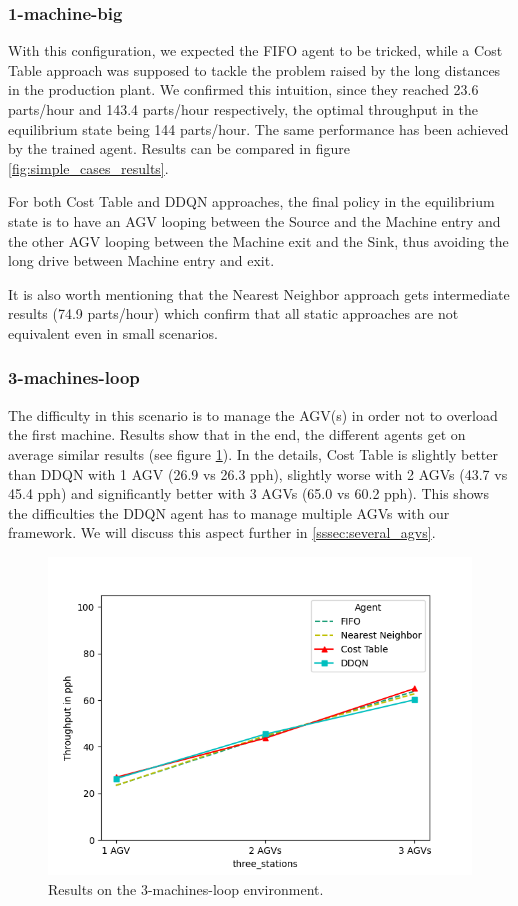 \documentclass[sn-mathphys]{sn-jnl}
\begin{document}
\subsubsection{1-machine-big}

With this configuration, we expected the FIFO agent to be tricked, while a Cost Table approach was supposed to tackle the problem raised by the long distances in the production plant. We confirmed this intuition, since they reached 23.6 parts/hour and 143.4 parts/hour respectively, the optimal throughput in the equilibrium state being 144 parts/hour. The same performance has been achieved by the trained agent. Results can be compared in figure \ref{fig:simple_cases_results}.

For both Cost Table and DDQN approaches, the final policy in the equilibrium state is to have an AGV looping between the Source and the Machine entry and the other AGV looping between the Machine exit and the Sink, thus avoiding the long drive between Machine entry and exit.

It is also worth mentioning that the Nearest Neighbor approach gets intermediate results (74.9 parts/hour) which confirm that all static approaches are not equivalent even in small scenarios.

\subsubsection{3-machines-loop}

The difficulty in this scenario is to manage the AGV(s) in order not to overload the first machine. Results show that in the end, the different agents get on average similar results (see figure \ref{fig:3_machines_results}). In the details, Cost Table is slightly better than DDQN with 1 AGV (26.9 vs 26.3 pph), slightly worse with 2 AGVs (43.7 vs 45.4 pph) and significantly better with 3 AGVs (65.0 vs 60.2 pph). This shows the difficulties the DDQN agent has to manage multiple AGVs with our framework. We will discuss this aspect further in \ref{sssec:several_agvs}.

\begin{figure}[ht]
  \includegraphics[width=1.0\textwidth]{results_3_machines.png}
  \caption{Results on the $3$-machines-loop environment.}
  \label{fig:3_machines_results}
\end{figure}
\end{document}
